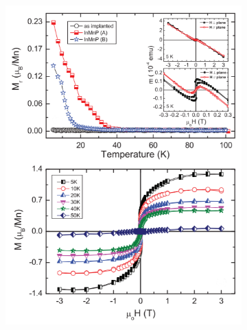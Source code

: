 \documentclass[main.tex]{subfiles}
\begin{document}
\begin{figure}[!htb]
\centering
	\begin{subfigure}[h]{0.45\textwidth}
		\centering
		\includegraphics[width=\linewidth]{khalid1}
  		\caption{}
	\end{subfigure}
	\begin{subfigure}[h]{0.47\textwidth}
  		\centering

\end{subfigure}
\end{figure}
\end{document}
